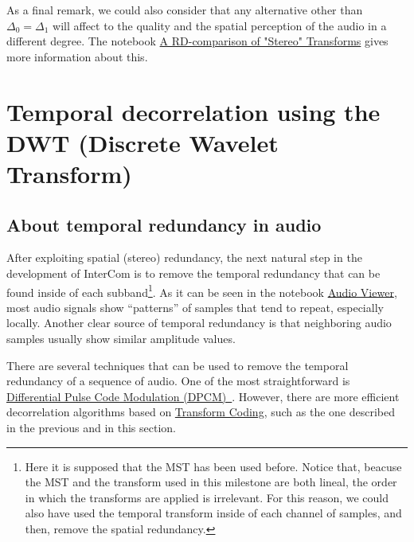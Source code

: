 As a final remark, we could also consider that any alternative other
than $\Delta_0=\Delta_1$ will affect to the quality and the spatial
perception of the audio in a different degree. The notebook
\href{https://github.com/Tecnologias-multimedia/Tecnologias-multimedia.github.io/blob/master/contents/transform_coding/stereo_transforms_RD.ipynb}{A
  RD-comparison of "Stereo" Transforms} gives more information about
this.



\section{Temporal decorrelation using the DWT (Discrete Wavelet Transform)}

\subsection{About temporal redundancy in audio}

After exploiting spatial (stereo) redundancy, the next natural step in
the development of InterCom is to remove the temporal redundancy that
can be found inside of each subband\footnote{Here it is supposed that
  the MST has been used before. Notice that, beacuse the MST and the
  transform used in this milestone are both lineal, the order in which
  the transforms are applied is irrelevant. For this reason, we could
  also have used the temporal transform inside of each channel of
  samples, and then, remove the spatial redundancy.}. As it can be
seen in the notebook
\href{https://github.com/Tecnologias-multimedia/intercom/blob/master/tools/audio_viewer.ipynb}{Audio
  Viewer}, most audio signals show ``patterns'' of samples that tend
to repeat, especially locally. Another clear source of temporal
redundancy is that neighboring audio samples usually show similar
amplitude values.

There are several techniques that can be used to remove the
temporal redundancy of a sequence of audio. One of the most
straightforward is
\href{https://en.wikipedia.org/wiki/Differential_pulse-code_modulation}{Differential
  Pulse Code Modulation
  (DPCM)~\cite{sayood2017introduction}}. However, there are more
efficient decorrelation algorithms based on
\href{https://en.wikipedia.org/wiki/Transform_coding}{Transform
  Coding}, such as the one described in the previous and in this
section.

